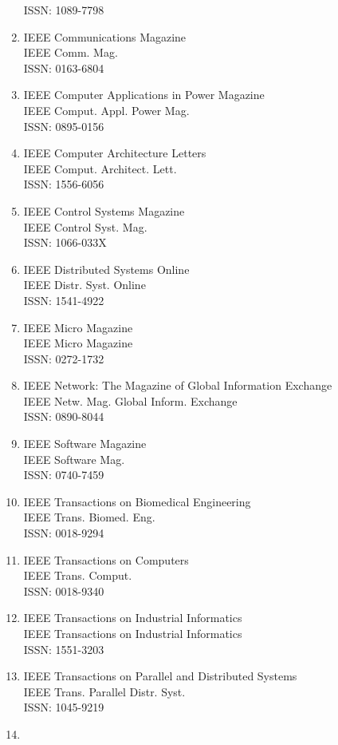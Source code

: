 \begin{enumerate}
 ISSN: 1089-7798
\item
 IEEE Communications Magazine\\
 IEEE Comm. Mag.\\
 ISSN: 0163-6804
\item
 IEEE Computer Applications in Power Magazine\\
 IEEE Comput. Appl. Power Mag.\\
 ISSN: 0895-0156
\item
 IEEE Computer Architecture Letters\\
 IEEE Comput. Architect. Lett.\\
 ISSN: 1556-6056
\item
 IEEE Control Systems Magazine\\
 IEEE Control Syst. Mag.\\
 ISSN: 1066-033X
\item
 IEEE Distributed Systems Online\\
 IEEE Distr. Syst. Online\\
 ISSN: 1541-4922
\item
 IEEE Micro Magazine\\
 IEEE Micro Magazine\\
 ISSN: 0272-1732
\item
 IEEE Network: The Magazine of Global Information Exchange\\
 IEEE Netw. Mag. Global Inform. Exchange\\
 ISSN: 0890-8044
\item
 IEEE Software Magazine\\
 IEEE Software Mag.\\
 ISSN: 0740-7459
\item
 IEEE Transactions on Biomedical Engineering\\
 IEEE Trans. Biomed. Eng.\\
 ISSN: 0018-9294
\item
 IEEE Transactions on Computers\\
 IEEE Trans. Comput.\\
 ISSN: 0018-9340
\item
 IEEE Transactions on Industrial Informatics\\
 IEEE Transactions on Industrial Informatics\\
 ISSN: 1551-3203
\item
 IEEE Transactions on Parallel and Distributed Systems\\
 IEEE Trans. Parallel Distr. Syst.\\
 ISSN: 1045-9219
\item

\end{enumerate}
